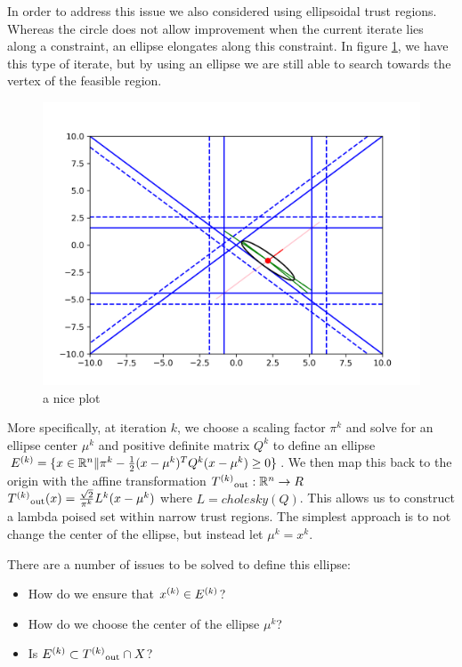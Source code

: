 In order to address this issue we also considered using ellipsoidal trust regions.
Whereas the circle does not allow improvement when the current iterate lies along a constraint, an ellipse elongates along this constraint.
In figure \ref{ellipse_adv}, we have this type of iterate, but by using an ellipse we are still able to search towards the vertex of the feasible region.
\begin{figure}[h]
    \centering
    \includegraphics[scale=0.4]{images/advantage_of_ellipse_2.png}
    \caption{a nice plot}
    \label{ellipse_adv}
\end{figure}


More specifically, at iteration $k$, we choose a scaling factor $\pi^k$ and solve for an ellipse center $\mu^k$ and positive definite matrix $Q^k$ to define an ellipse
$ {E^{(k)}} = \{x \in \mathbb R^n \| \pi^k - \frac 1 2 (x - \mu^{k})^TQ^{k}(x - \mu^{k}) \ge 0 \}$.
We then map this back to the origin with the affine transformation ${T^{(k)}}_{\text{out}} : \mathbb R^n \to R$ ${T^{(k)}}_{\text{out}}(x) = \frac {\sqrt{2}}{\pi^k} L^k(x-\mu^k)$ where $L = cholesky(Q)$.
This allows us to construct a lambda poised set within narrow trust regions.
The simplest approach is to not change the center of the ellipse, but instead let $\mu^k = x^k$.

There are a number of issues to be solved to define this ellipse:
\begin{itemize}
\item How do we ensure that ${x}^{(k)} \in {E^{(k)}}$?
\item How do we choose the center of the ellipse $\mu^k$?
\item Is $ {E^{(k)}} \subset {T^{(k)}}_{\text{out}} \cap X$?
\end{itemize}


